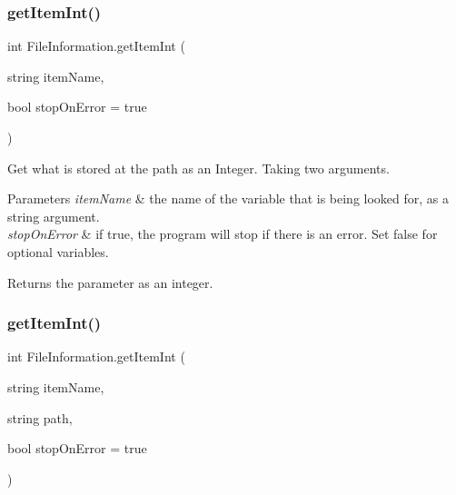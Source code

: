 \subsubsection{\texorpdfstring{getItemInt()}{getItemInt()}\hspace{0.1cm}{\footnotesize\ttfamily [1/2]}}
{\footnotesize\ttfamily int File\+Information.\+get\+Item\+Int (\begin{DoxyParamCaption}\item[{string}]{item\+Name,  }\item[{bool}]{stop\+On\+Error = {\ttfamily true} }\end{DoxyParamCaption})\hspace{0.3cm}{\ttfamily [inline]}}



Get what is stored at the path as an Integer. Taking two arguments. 


\begin{DoxyParams}{Parameters}
{\em item\+Name} & the name of the variable that is being looked for, as a string argument. \\
\hline
{\em stop\+On\+Error} & if true, the program will stop if there is an error. Set false for optional variables. \\
\hline
\end{DoxyParams}
\begin{DoxyReturn}{Returns}
the parameter as an integer. 
\end{DoxyReturn}
\mbox{\label{class_file_information_a90707864460a1e36c7219732ed5e628f}} 
\subsubsection{\texorpdfstring{getItemInt()}{getItemInt()}\hspace{0.1cm}{\footnotesize\ttfamily [2/2]}}
{\footnotesize\ttfamily int File\+Information.\+get\+Item\+Int (\begin{DoxyParamCaption}\item[{string}]{item\+Name,  }\item[{string}]{path,  }\item[{bool}]{stop\+On\+Error = {\ttfamily true} }\end{DoxyParamCaption})\hspace{0.3cm}{\ttfamily [inline]}}



